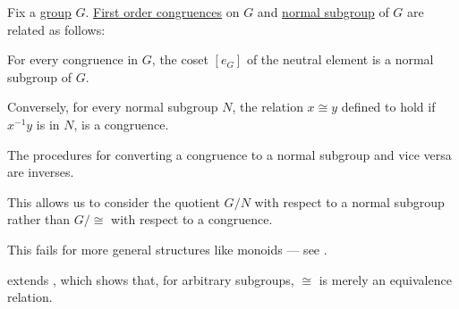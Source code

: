 \begin{proposition}\label{thm:normal_subgroups_and_congruences}
  Fix a \hyperref[def:group]{group} \( G \). \hyperref[def:first_order_congruence]{First order congruences} on \( G \) and \hyperref[def:normal_subgroup]{normal subgroup} of \( G \) are related as follows:
  \begin{thmenum}
     For every congruence in \( G \), the coset \( [e_G] \) of the neutral element is a normal subgroup of \( G \).

     Conversely, for every normal subgroup \( N \), the relation \( x \cong y \) defined to hold if \( x^{-1} y \) is in \( N \), is a congruence.

     The procedures for converting a congruence to a normal subgroup and vice versa are inverses.
  \end{thmenum}
\end{proposition}
\begin{comments}
  \item This allows us to consider the quotient \( G / N \) with respect to a normal subgroup rather than \( G / {\cong} \) with respect to a congruence.

  \item This fails for more general structures like monoids --- see .

  \item {} extends , which shows that, for arbitrary subgroups, \( {\cong} \) is merely an equivalence relation.
\end{comments}

